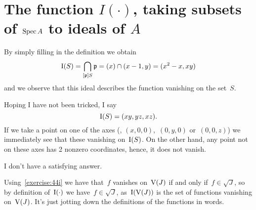 \section{The function \texorpdfstring{$I(\cdot)$}{I(-)}, taking subsets of \texorpdfstring{$\operatorname{Spec} A$}{Spec A} to ideals of \texorpdfstring{$A$}{A}}

\begin{exercise}
  By simply filling in the definition we obtain
  \begin{equation}
    \operatorname{I}(S)=\bigcap_{[\mathfrak{p}]S}\mathfrak{p}=(x)\cap(x-1,y)=(x^2-x,xy)
  \end{equation}
  and we observe that this ideal describes the function vanishing on the set~$S$.
\end{exercise}

\begin{exercise}
  Hoping I have not been tricked, I say
  \begin{equation}
    \operatorname{I}(S)=(xy,yz,xz).
  \end{equation}
  If we take a point on one of the axes (\ie, $(x,0,0)$,~$(0,y,0)$ or~$(0,0,z)$) we immediately see that these vanishing on~$\operatorname{I}(S)$. On the other hand, any point not on these axes has 2 nonzero coordinates, hence, it does not vanish.
\end{exercise}

\begin{exercise} %
  I don't have a satisfying answer.
\end{exercise}

\begin{exercise}
  Using~\autoref{exercise:44i} we have that~$f$ vanishes on~$\operatorname{V}(J)$ if and only if~$f\in\sqrt{J}$, so by definition of~$\operatorname{I}(\cdot)$ we have~$f\in\sqrt{J}$, as~$\operatorname{I}(\operatorname{V}(J))$ is the set of functions vanishing on~$\operatorname{V}(J)$. It's just jotting down the definitions of the functions in words.
\end{exercise}

